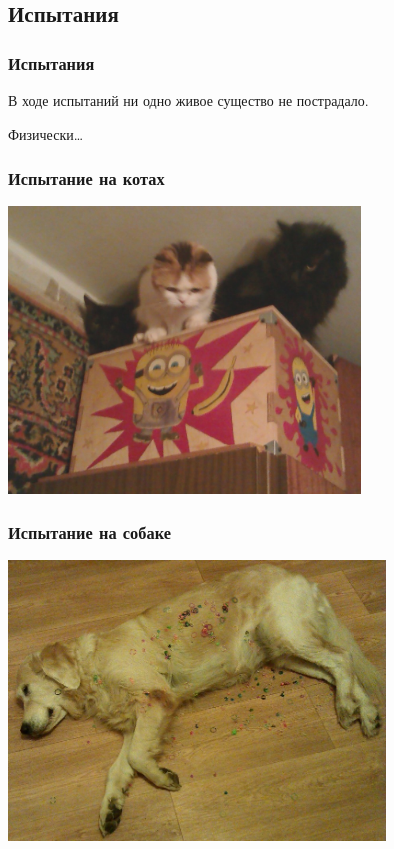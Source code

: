 \subsection{Испытания \myDevice}

\begin{frame}
    \frametitle{Испытания \myDevice}
    \begin{center}
        В ходе испытаний ни одно живое существо не пострадало.

        Физически\ldots    
    \end{center}    
\end{frame}

\begin{frame}
    \frametitle{Испытание на котах}
    
    \begin{center}
        \includegraphics[width=0.7\textwidth]{fig/cats}
    \end{center}
\end{frame}

\begin{frame}
    \frametitle{Испытание на собаке}
    
    \begin{center}
        \includegraphics[width=0.75\textwidth]{fig/dog}
    \end{center}
\end{frame}

